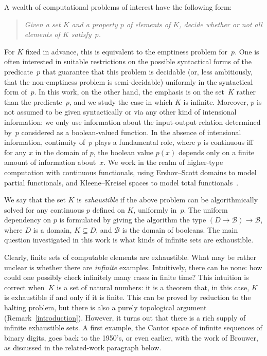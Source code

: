\documentclass{LMCS}
\newcommand{\pBool}{\mathcal{B}}
\begin{document}
\noindent
A wealth of computational problems of interest have the following
form:
\begin{quote}
  \em Given a set $K$ and a property $p$ of elements of $K$, decide
  whether or not \emph{all} elements of $K$ satisfy~$p$.
\end{quote}
For $K$ fixed in advance, this is equivalent to the emptiness problem
for~$p$. One is often interested in suitable restrictions on the
possible syntactical forms of the predicate~$p$ that guarantee that
this problem is decidable (or, less ambitiously, that the
non-emptiness problem is semi-decidable) uniformly in the syntactical
form of~$p$. 
In this work, on the other hand, the emphasis is on the set~$K$ rather
than the predicate~$p$, and we study the case in which $K$ is
infinite. Moreover, $p$ is not assumed to be given syntactically or
via any other kind of intensional information: we only use information
about the input-output relation determined by~$p$ considered as a
boolean-valued function.
In the absence of intensional information, continuity of~$p$ plays a
fundamental role, where $p$ is continuous iff for any $x$ in the
domain of $p$, the boolean value $p(x)$ depends only on a finite
amount of information about~$x$.  We work in the realm of higher-type
computation with continuous functionals, using Ershov--Scott domains
to model partial functionals, and Kleene--Kreisel spaces to model
total functionals~\cite{normann:computer,normann:recursion}.

\pagebreak[3]
We say that the set $K$ is \emph{exhaustible} if the above problem can
be algorithmically solved for any continuous $p$ defined on $K$,
uniformly in~$p$. The uniform dependency on $p$ is formulated by
giving the algorithm the type $(D \to \pBool) \to \pBool$, where $D$
is a domain, $K \subseteq D$, and $\pBool$ is the domain of booleans.
The main question investigated in this work is what kinds of infinite
sets are exhaustible.

Clearly, finite sets of computable elements are exhaustible. What may
be rather unclear is whether there are \emph{infinite} examples.
Intuitively, there can be none: how could one possibly check
infinitely many cases in finite time? This intuition is correct
when~$K$ is a set of natural numbers: it is a theorem that, in this
case, $K$ is exhaustible if and only if it is finite.  This can be
proved by reduction to the halting problem, but there is also a purely
topological argument (Remark~\ref{introduction}).  However, it turns
out that there is a rich supply of infinite exhaustible sets. A first
example, the Cantor space of infinite sequences of binary digits, goes
back to the 1950's, or even earlier, with the work of Brouwer, as
discussed in the related-work paragraph below.
\end{document}
